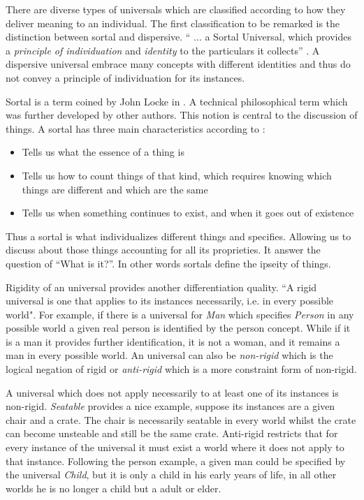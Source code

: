 There are diverse types of universals which are classified according to how they deliver meaning to an individual. The first classification to be remarked is the distinction between sortal and dispersive. `` ... a Sortal Universal, which provides a \textit{principle of individuation} and \textit{identity} to the particulars it collects'' \citep{guizzardi_ontological_2005}. A dispersive universal embrace many concepts with different identities and thus do not convey a principle of individuation for its instances.

Sortal is a term coined by John Locke in \cite{locke1841essay}. A technical philosophical term which was further developed by other authors. This notion is central to the discussion of things. A sortal has three main characteristics according to \cite{sep-sortals}:

\begin{itemize}
    \item Tells us what the essence of a thing is
    \item Tells us how to count things of that kind, which requires knowing which things are different and which are the same
    \item Tells us when something continues to exist, and when it goes out of existence
\end{itemize}

Thus a sortal is what individualizes different things and specifies. Allowing us to discuss about those things accounting for all its proprieties. It answer the question of ``What is it?''. In other words sortals define the ipseity of things. 


Rigidity of an universal provides another differentiation quality. ``A rigid universal is one that applies to its instances necessarily, i.e. in every possible world"\citep{guizzardi_ontological_2005}. For example, if there is a universal for \textit{Man} which specifies \textit{Person} in any possible world a given real person is identified by the person concept. While if it is a man it provides further identification, it is not a woman, and it remains a man in every possible world. An universal can also be \textit{non-rigid} which is the logical negation of rigid or \textit{anti-rigid} which is a more constraint form of non-rigid.

A universal which does not apply necessarily to at least one of its instances is non-rigid. \textit{Seatable} provides a nice example, suppose its instances are a given chair and a crate. The chair is necessarily seatable in every world whilst the crate can become unsteable and still be the same crate. Anti-rigid restricts that for every instance of the universal it must exist a world where it does not apply to that instance. Following the person example, a given man could be specified by the universal \textit{Child}, but it is only a child in his early years of life, in all other worlds he is no longer a child but a adult or elder.

